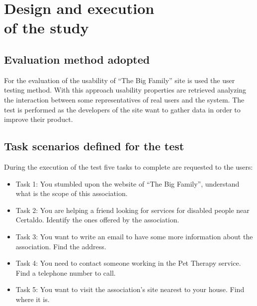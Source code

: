 %
%
\chapter{Design and execution\\of the study}
%
%
%
\section{Evaluation method adopted}
For the evaluation of the usability of ``The Big Family'' site is used the user testing method. With this approach usability properties are retrieved analyzing the interaction between some representatives of real users and the system. The test is performed as the developers of the site want to gather data in order to improve their product.
%
%
\section{Task scenarios defined for the test}
During the execution of the test five tasks to complete are requested to the users:
\begin{itemize}
\item Task 1: You stumbled upon the website of ``The Big Family'', understand what is the scope of this association.
\item Task 2: You are helping a friend looking for services for disabled people near Certaldo. Identify the ones offered by the association.
\item Task 3: You want to write an email to have some more information about the association. Find the address.
\item Task 4: You need to contact someone working in the Pet Therapy service. Find a telephone number to call.
\item Task 5: You want to visit the association's site nearest to your house. Find where it is.
\end{itemize}
%
%
